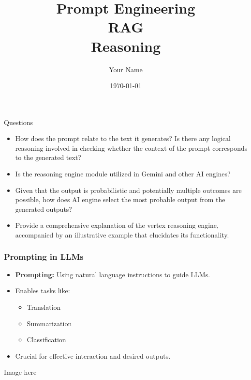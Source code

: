
\usepackage{titlesec}

\title{Prompt Engineering\\RAG\\Reasoning}
\author{Your Name}
\date{\today}



\maketitle

\begin{frame}[fragile]
\begin{block}{Questions}
\begin{itemize}
\item How does the prompt relate to the text it generates? Is there any logical reasoning involved in checking whether the context of the prompt corresponds to the generated text?
\item Is the reasoning engine module utilized in Gemini and other AI engines?
\item Given that the output is probabilistic and potentially multiple outcomes are possible, how does AI engine select the most probable output from the generated outputs?
\item Provide a comprehensive explanation of the vertex reasoning engine, accompanied by an illustrative example that elucidates its functionality.
\end{itemize}
\end{block}
\end{frame}
\begin{frame}
    \frametitle{Prompting in LLMs}
    \begin{itemize}
        \item \textbf{Prompting:} Using natural language instructions to guide LLMs.
        \item Enables tasks like:
            \begin{itemize}
                \item Translation
                \item Summarization
                \item Classification
            \end{itemize}
        \item  Crucial for effective interaction and desired outputs.
    \end{itemize}
    Image here
\end{frame}

